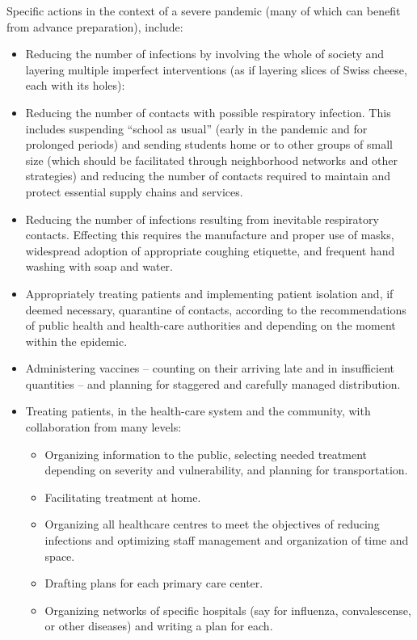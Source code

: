 \documentclass[12pt, a4]{scrartcl}
\begin{document}
Specific actions in the context of a severe pandemic (many of which can benefit from advance preparation), include:
\begin{itemize}
	\item Reducing the number of infections by involving the whole of society and layering multiple imperfect interventions (as if layering slices of Swiss cheese, each with its holes):
	\item Reducing the number of contacts with possible respiratory infection. This includes suspending “school as usual” (early in the pandemic and for prolonged periods) and sending students home or to other groups of small size (which should be facilitated through neighborhood networks and other strategies) and reducing the number of contacts required to maintain and protect essential supply chains and services.
	\item Reducing the number of infections resulting from inevitable respiratory contacts. Effecting this requires the manufacture and proper use of masks, widespread adoption of appropriate coughing etiquette, and frequent hand washing with soap and water.
	\item Appropriately treating patients and implementing patient isolation and, if deemed necessary, quarantine of contacts, according to the recommendations of public health and health-care authorities and depending on the moment within the epidemic.
	\item Administering vaccines – counting on their arriving late and in insufficient quantities – and planning for staggered and carefully managed distribution.
	\item Treating patients, in the health-care system and the community, with collaboration from many levels:
\begin{itemize}
	\item Organizing information to the public, selecting needed treatment depending on severity and vulnerability, and planning for transportation.
	\item Facilitating treatment at home.
	\item Organizing all healthcare centres to meet the objectives of reducing infections and optimizing staff management and organization of time and space.
	\item Drafting plans for each primary care center.
	\item Organizing networks of specific hospitals (say for influenza, convalescense, or other diseases)
and writing a plan for each.
\end{itemize}
\end{itemize}
\end{document}
